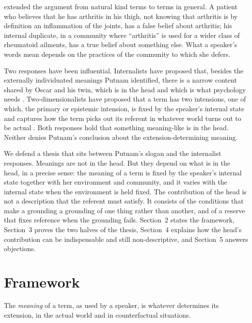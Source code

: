 \documentclass{situationist-preprint}
\begin{document}
\citet{Burge1979} extended the argument from natural kind terms to terms in general. A patient who believes that he has arthritis in his thigh, not knowing that arthritis is by definition an inflammation of the joints, has a false belief about arthritis; his internal duplicate, in a community where \enquote{arthritis} is used for a wider class of rheumatoid ailments, has a true belief about something else. What a speaker's words mean depends on the practices of the community to which she defers.

Two responses have been influential. Internalists have proposed that, besides the externally individuated meanings Putnam identified, there is a narrow content shared by Oscar and his twin, which is in the head and which is what psychology needs \citep{Fodor1987,Segal2000}. Two-dimensionalists have proposed that a term has two intensions, one of which, the primary or epistemic intension, is fixed by the speaker's internal state and captures how the term picks out its referent in whatever world turns out to be actual \citep{Jackson1998,Chalmers2002}. Both responses hold that something meaning-like is in the head. Neither denies Putnam's conclusion about the extension-determining meaning.

We defend a thesis that sits between Putnam's slogan and the internalist responses. Meanings are not in the head. But they depend on what is in the head, in a precise sense: the meaning of a term is fixed by the speaker's internal state together with her environment and community, and it varies with the internal state when the environment is held fixed. The contribution of the head is not a description that the referent must satisfy. It consists of the conditions that make a grounding a grounding of one thing rather than another, and of a reserve that fixes reference when the grounding fails. Section~2 states the framework, Section~3 proves the two halves of the thesis, Section~4 explains how the head's contribution can be indispensable and still non-descriptive, and Section~5 answers objections.

\section{Framework}

\begin{definition}\label{d:meaning}
The \emph{meaning} of a term, as used by a speaker, is whatever determines its extension, in the actual world and in counterfactual situations.
\end{definition}
\end{document}
